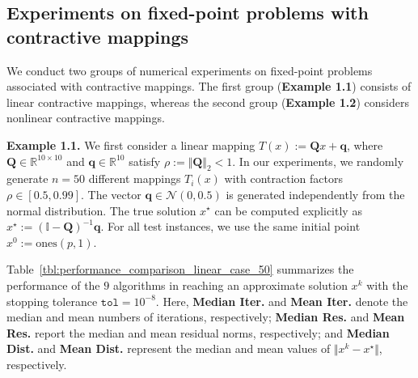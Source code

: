 \documentclass{article}
\theoremstyle{plain}
\theoremstyle{definition}
\newcommand{\Id}{\mathbb{I}}
\newcommand{\R}{\mathbb{R}}
\newcommand{\norms}[1]{\Vert#1\Vert}
\newcommand{\0}{\boldsymbol{0}}
\begin{document}
\subsection{Experiments on fixed-point problems with contractive mappings}\label{subsec:example1}
We conduct two groups of numerical experiments on fixed-point problems associated with contractive mappings. The first group (\textbf{Example 1.1}) consists of linear contractive mappings, whereas the second group (\textbf{Example 1.2}) considers nonlinear contractive mappings.

\vspace{2ex}
\noindent\textbf{Example 1.1.} 
We first consider a linear mapping $T(x) := \mathbf{Q}x + \mathbf{q}$, where $\mathbf{Q} \in \R^{10\times 10}$ and $\mathbf{q}\in\R^{10}$ satisfy $\rho := \norms{\mathbf{Q}}_2 < 1$. 
In our experiments, we randomly generate $n=50$ different mappings $T_i(x)$ with contraction factors $\rho \in [0.5, 0.99]$. 
The vector $\mathbf{q} \in \mathcal{N}(0, 0.5)$ is generated independently from the normal distribution. 
The true solution $x^{\star}$ can be computed explicitly as $x^{\star} := (\Id - \mathbf{Q})^{-1}\mathbf{q}$. 
For all test instances, we use the same initial point $x^0 := \mathrm{ones}(p,1)$.

Table~\ref{tbl:performance_comparison_linear_case_50} summarizes the performance of the $9$ algorithms in reaching an approximate solution $x^k$ with the stopping tolerance $\texttt{tol} = 10^{-8}$. 
Here, \textbf{Median Iter.} and \textbf{Mean Iter.} denote the median and mean numbers of iterations, respectively; \textbf{Median Res.} and \textbf{Mean Res.} report the median and mean residual norms, respectively; and \textbf{Median Dist.} and \textbf{Mean Dist.} represent the median and mean values of $\norms{x^k - x^{\star}}$, respectively.
\end{document}
